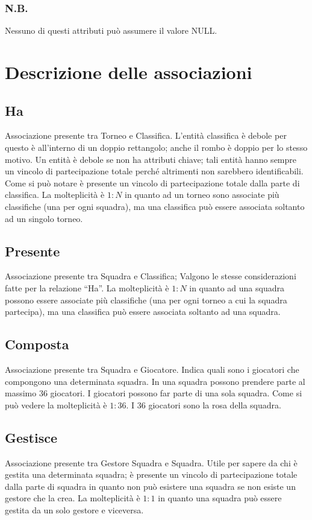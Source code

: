 		\subsubsection*{N.B.}
		Nessuno di questi attributi può assumere il valore NULL.

\section{Descrizione delle associazioni}
	
	\subsection{Ha}
	Associazione presente tra Torneo e Classifica.
	L’entità classifica è debole per questo è all'interno di un doppio rettangolo; anche il rombo è doppio per lo stesso motivo. 
	Un entità è debole se non ha attributi chiave; tali entità hanno sempre un vincolo di partecipazione totale perché altrimenti non sarebbero identificabili. Come si può notare è presente un vincolo di partecipazione totale dalla parte di classifica.
	La molteplicità è $1:N$ in quanto ad un torneo sono associate più classifiche (una per ogni squadra), ma una classifica può essere associata soltanto ad un singolo torneo.
	
	\subsection{Presente}
	Associazione presente tra Squadra e Classifica;
	Valgono le stesse considerazioni fatte per la relazione ``Ha''.
	La molteplicità è $1:N$ in quanto ad una squadra possono essere associate più classifiche (una per ogni torneo a cui la squadra partecipa), ma una classifica può essere associata soltanto ad una squadra.
	
	\subsection{Composta}
	Associazione presente tra Squadra e Giocatore.
	Indica quali sono i giocatori che compongono una determinata squadra. In una squadra possono prendere parte al massimo $36$ giocatori. I giocatori possono far parte di una sola squadra. Come si può vedere la molteplicità è $1: 36$.
	I $36$ giocatori sono la rosa della squadra.
	
	\subsection{Gestisce}
	Associazione presente tra Gestore Squadra e Squadra.
	Utile per sapere da chi è gestita una determinata squadra; è presente un vincolo di partecipazione totale dalla parte di squadra in quanto non può esistere una squadra se non esiste un gestore che la crea.
	La molteplicità è $1:1$ in quanto una squadra può essere gestita da un solo gestore e viceversa.
	
